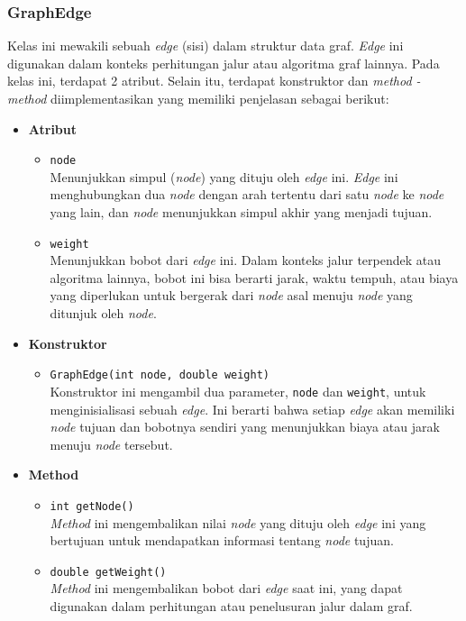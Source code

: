 \subsubsection{GraphEdge}
Kelas ini mewakili sebuah \textit{edge} (sisi) dalam struktur data graf. \textit{Edge} ini digunakan dalam konteks perhitungan jalur atau algoritma graf lainnya. Pada kelas ini, terdapat 2 atribut. Selain itu, terdapat konstruktor dan \textit{method - method} diimplementasikan yang memiliki penjelasan sebagai berikut:
\begin{itemize}
    \item \textbf{Atribut}
    \begin{itemize}
        \item \texttt{node}
        \\ Menunjukkan simpul (\textit{node}) yang dituju oleh \textit{edge} ini. \textit{Edge} ini menghubungkan dua \textit{node} dengan arah tertentu dari satu \textit{node} ke \textit{node} yang lain, dan \textit{node} menunjukkan simpul akhir yang menjadi tujuan.
        \item \texttt{weight}
        \\ Menunjukkan bobot dari \textit{edge} ini. Dalam konteks jalur terpendek atau algoritma lainnya, bobot ini bisa berarti jarak, waktu tempuh, atau biaya yang diperlukan untuk bergerak dari \textit{node} asal menuju \textit{node} yang ditunjuk oleh \textit{node}.
    \end{itemize}

    \item \textbf{Konstruktor}
    \begin{itemize}
        \item \texttt{GraphEdge(int node, double weight)}
        \\ Konstruktor ini mengambil dua parameter, \texttt{node} dan \texttt{weight}, untuk menginisialisasi sebuah \textit{edge}. Ini berarti bahwa setiap \textit{edge} akan memiliki \textit{node} tujuan dan bobotnya sendiri yang menunjukkan biaya atau jarak menuju \textit{node} tersebut.
    \end{itemize}

    \item \textbf{Method}
    \begin{itemize}
        \item \texttt{int getNode()}
        \\ \textit{Method} ini mengembalikan nilai \textit{node} yang dituju oleh \textit{edge} ini yang bertujuan untuk mendapatkan informasi tentang \textit{node} tujuan.
        \item \texttt{double getWeight()}
        \\ \textit{Method} ini mengembalikan bobot dari \textit{edge} saat ini, yang dapat digunakan dalam perhitungan atau penelusuran jalur dalam graf.
    \end{itemize}
\end{itemize}


